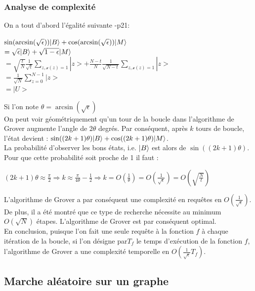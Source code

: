 \documentclass[12pt,openany]{report}
\DeclarePairedDelimiter\ket{\lvert}{\rangle}
\begin{document}
\subsubsection{Analyse de complexité}
On a tout d'abord l'égalité suivante \cite{Ghazal}-p21:
\begin{center}


$\sin(\arcsin(\sqrt{\epsilon}))\ket{B} + \cos(\arcsin(\sqrt{\epsilon}))\ket{M}  $\\
$= \sqrt{\epsilon} \ket{B} + \sqrt{1-\epsilon}\ket{M} $\\
$=\sqrt{\frac{t}{N}} \frac{1}{\sqrt{t}}\sum_{z,\mathcal{x}(z)=1}|z> + \frac{N-t}{N} \frac{1}{\sqrt{N-t}} \sum_{z,\mathcal{x}(z)=1} |z>$\\
$= \frac{1}{\sqrt{N}}\sum_{z=0}^{N-1}|z> $\\
$=|U> $
\end{center}
Si l'on note $\theta = \arcsin(\sqrt{\epsilon})   $\\
 On peut voir géométriquement qu’un tour de la boucle dans l’algorithme de Grover augmente l’angle de $2\theta $ degrés. Par conséquent, après $k$ tours de boucle,
l’état devient : $\sin((2k + 1)\theta)\ket{B} + \cos((2k + 1)\theta)\ket{M}$.\\
La probabilité d’observer les bons états, i.e. $\ket{B}$ est alors de $\sin((2k+ 1)\theta)$. Pour
que cette probabilité soit proche de 1 il faut :\\

\begin{center}
$ (2k+1)\theta \approx \frac{\pi}{2} \Rightarrow k \approx \frac{\pi}{4\theta}-\frac{1}{2} \Rightarrow k = O(\frac{1}{\theta})=O(\frac{1}{\sqrt{\epsilon}})= O(\sqrt{\frac{N}{t}})$
\end{center}

L’algorithme de Grover a par conséquent une complexité en requêtes en  $O(\frac{1}{\sqrt{\epsilon}}) $.
De plus, il a été montré que ce type de recherche nécessite au minimum $O(\sqrt{N})  $
étapes. L’algorithme de Grover est par conséquent optimal.\\
En conclusion, puisque l’on fait une seule requête à la fonction $f$ à chaque
itération de la boucle, si l’on désigne par$ T_f$ le temps d’exécution de la fonction
$f$, l’algorithme de Grover a une complexité temporelle en $ O(\frac{1}{\sqrt{\epsilon}}T_f)$.

\subsection{Marche aléatoire sur un graphe}
\end{document}
